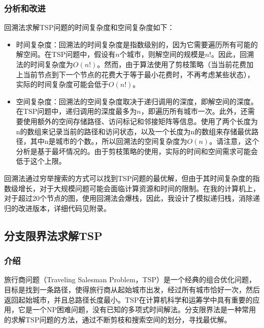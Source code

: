 \documentclass[lang=cn,11pt,a4paper]{elegantpaper}
\begin{document}
\subsubsection{分析和改进}
回溯法求解TSP问题的时间复杂度和空间复杂度如下：

\begin{itemize}
\item 时间复杂度：回溯法的时间复杂度是指数级别的，因为它需要遍历所有可能的解空间。在TSP问题中，假设有$n$个城市，则解空间的规模是$n!$。因此，回溯法的时间复杂度为$O(n!)$。然而，由于算法使用了剪枝策略（当当前花费加上当前节点到下一个节点的花费大于等于最小花费时，不再考虑某些状态），实际的时间复杂度可能会低于$O(n!)$。

\item 空间复杂度：回溯法的空间复杂度取决于递归调用的深度，即解空间的深度。在TSP问题中，递归调用的深度最多为$n$，即遍历所有城市一次。此外，还需要使用额外的空间存储路径、访问标记和邻接矩阵等信息。使用了两个长度为n的数组来记录当前的路径和访问状态，以及一个长度为n的数组来存储最优路径，其中n是城市的个数。，所以回溯法的空间复杂度为$O(n)$。请注意，这个分析是基于最坏情况的。由于剪枝策略的使用，实际的时间和空间需求可能会低于这个上限。
\end{itemize}

回溯法通过穷举搜索的方式可以找到TSP问题的最优解，但由于其时间复杂度的指数级增长，对于大规模问题可能会面临计算资源和时间的限制。在我的计算机上，对于超过20个节点的图，使用回溯法会爆栈，因此，我设计了模拟递归栈，消除递归的改进版本，详细代码见附录。


\subsection{分支限界法求解TSP}


\subsubsection{介绍}
旅行商问题（Traveling Salesman Problem，TSP）是一个经典的组合优化问题，目标是找到一条路径，使得旅行商从起始城市出发，经过所有城市恰好一次，然后返回起始城市，并且总路径长度最小。TSP在计算机科学和运筹学中具有重要的应用，它是一个NP困难问题，没有已知的多项式时间解法。分支限界法是一种常用的求解TSP问题的方法，通过不断剪枝和搜索空间的划分，寻找最优解。
\end{document}
